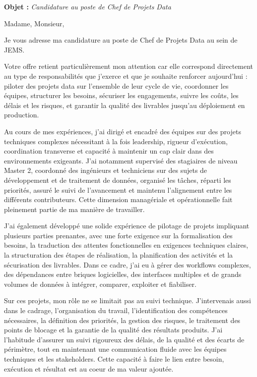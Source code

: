 \documentclass[11pt,a4paper]{../_shared/altacv}
\begin{document}
\makecvheader
\vspace{-0.6cm}
\vspace{-0.4cm}

{\color{accent}\textbf{Objet :}} \textit{Candidature au poste de Chef de Projets Data}

{\color{body}

Madame, Monsieur,

Je vous adresse ma candidature au poste de Chef de Projets Data au sein de JEMS.

Votre offre retient particulièrement mon attention car elle correspond directement au type de responsabilités que j'exerce et que je souhaite renforcer aujourd'hui : piloter des projets data sur l'ensemble de leur cycle de vie, coordonner les équipes, structurer les besoins, sécuriser les engagements, suivre les coûts, les délais et les risques, et garantir la qualité des livrables jusqu'au déploiement en production.

Au cours de mes expériences, j'ai dirigé et encadré des équipes sur des projets techniques complexes nécessitant à la fois leadership, rigueur d'exécution, coordination transverse et capacité à maintenir un cap clair dans des environnements exigeants. J'ai notamment supervisé des stagiaires de niveau Master 2, coordonné des ingénieurs et techniciens sur des sujets de développement et de traitement de données, organisé les tâches, réparti les priorités, assuré le suivi de l'avancement et maintenu l'alignement entre les différents contributeurs. Cette dimension managériale et opérationnelle fait pleinement partie de ma manière de travailler.

J'ai également développé une solide expérience de pilotage de projets impliquant plusieurs parties prenantes, avec une forte exigence sur la formalisation des besoins, la traduction des attentes fonctionnelles en exigences techniques claires, la structuration des étapes de réalisation, la planification des activités et la sécurisation des livrables. Dans ce cadre, j'ai eu à gérer des workflows complexes, des dépendances entre briques logicielles, des interfaces multiples et de grands volumes de données à intégrer, comparer, exploiter et fiabiliser.

Sur ces projets, mon rôle ne se limitait pas au suivi technique. J'intervenais aussi dans le cadrage, l'organisation du travail, l'identification des compétences nécessaires, la définition des priorités, la gestion des risques, le traitement des points de blocage et la garantie de la qualité des résultats produits. J'ai l'habitude d'assurer un suivi rigoureux des délais, de la qualité et des écarts de périmètre, tout en maintenant une communication fluide avec les équipes techniques et les stakeholders. Cette capacité à faire le lien entre besoin, exécution et résultat est au coeur de ma valeur ajoutée.

}
\end{document}

